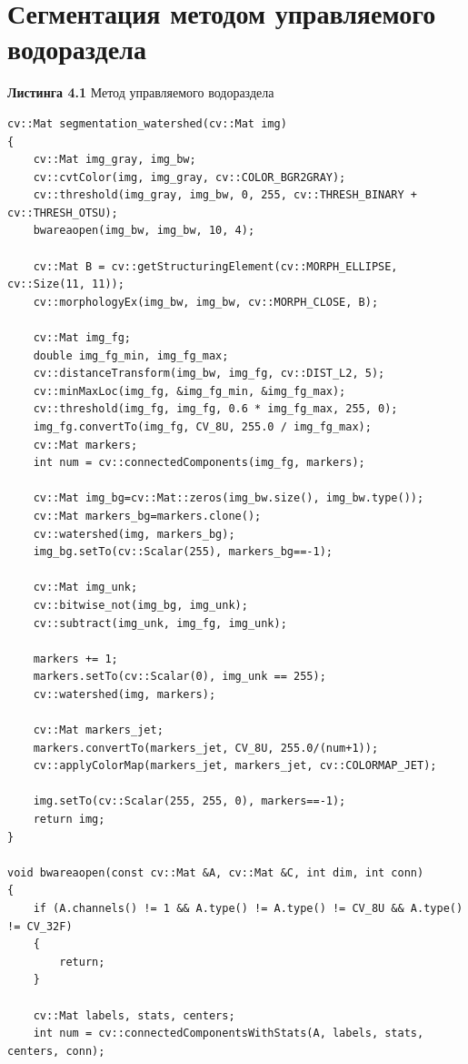 \section{Сегментация методом управляемого водораздела}
\noindent \textbf{Листинга 4.1} Метод управляемого водораздела
\begin{lstlisting}
cv::Mat segmentation_watershed(cv::Mat img)
{
    cv::Mat img_gray, img_bw;
    cv::cvtColor(img, img_gray, cv::COLOR_BGR2GRAY);
    cv::threshold(img_gray, img_bw, 0, 255, cv::THRESH_BINARY + cv::THRESH_OTSU);
    bwareaopen(img_bw, img_bw, 10, 4);

    cv::Mat B = cv::getStructuringElement(cv::MORPH_ELLIPSE, cv::Size(11, 11));
    cv::morphologyEx(img_bw, img_bw, cv::MORPH_CLOSE, B);

    cv::Mat img_fg;
    double img_fg_min, img_fg_max;
    cv::distanceTransform(img_bw, img_fg, cv::DIST_L2, 5);
    cv::minMaxLoc(img_fg, &img_fg_min, &img_fg_max);
    cv::threshold(img_fg, img_fg, 0.6 * img_fg_max, 255, 0);
    img_fg.convertTo(img_fg, CV_8U, 255.0 / img_fg_max);  
    cv::Mat markers;
    int num = cv::connectedComponents(img_fg, markers);

    cv::Mat img_bg=cv::Mat::zeros(img_bw.size(), img_bw.type());
    cv::Mat markers_bg=markers.clone();
    cv::watershed(img, markers_bg);
    img_bg.setTo(cv::Scalar(255), markers_bg==-1);

    cv::Mat img_unk;
    cv::bitwise_not(img_bg, img_unk);
    cv::subtract(img_unk, img_fg, img_unk);

    markers += 1;
    markers.setTo(cv::Scalar(0), img_unk == 255);
    cv::watershed(img, markers);

    cv::Mat markers_jet;
    markers.convertTo(markers_jet, CV_8U, 255.0/(num+1));
    cv::applyColorMap(markers_jet, markers_jet, cv::COLORMAP_JET);

    img.setTo(cv::Scalar(255, 255, 0), markers==-1);
    return img;
}

void bwareaopen(const cv::Mat &A, cv::Mat &C, int dim, int conn)
{
    if (A.channels() != 1 && A.type() != A.type() != CV_8U && A.type() != CV_32F)
    {
        return;
    }

    cv::Mat labels, stats, centers;
    int num = cv::connectedComponentsWithStats(A, labels, stats, centers, conn);


\end{lstlisting}
